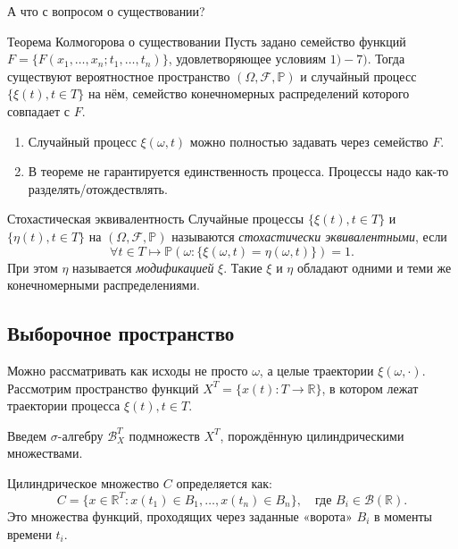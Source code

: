 А что с вопросом о существовании?

\begin{theorem}{Теорема Колмогорова о существовании}
    Пусть задано семейство функций $F = \{ F(x_1, \dots, x_n; t_1, \dots, t_n) \}$, удовлетворяющее условиям $1)-7)$.
    Тогда существуют вероятностное пространство $(\Omega, \mathcal{F}, \mathbb{P})$ и случайный процесс $\{\xi(t), t \in T\}$ на нём, семейство конечномерных распределений которого совпадает с $F$.
\end{theorem}

\begin{note}{}
    \begin{enumerate}
        \item Случайный процесс $\xi(\omega, t)$ можно полностью задавать через семейство $F$.
        \item В теореме не гарантируется единственность процесса. Процессы надо как-то разделять/отождествлять.
    \end{enumerate}
\end{note}

\begin{definition}{Стохастическая эквивалентность}
    Случайные процессы $\{\xi(t), t \in T\}$ и $\{\eta(t), t \in T\}$ на $(\Omega, \mathcal{F}, \mathbb{P})$ называются \textit{стохастически эквивалентными}, если
    \[
        \forall t \in T \longmapsto \mathbb{P}(\omega : \{ \xi(\omega, t) = \eta(\omega, t) \}) = 1.
    \]
    При этом $\eta$ называется \textit{модификацией} $\xi$. Такие $\xi$ и $\eta$ обладают одними и теми же конечномерными распределениями.
\end{definition}

\subsection*{Выборочное пространство}

Можно рассматривать как исходы не просто $\omega$, а целые траектории $\xi(\omega, \cdot)$. Рассмотрим пространство функций $X^T = \{x(t) : T \to \mathbb{R}\}$, в котором лежат траектории процесса $\xi(t), t \in T$.

Введем $\sigma$-алгебру $\mathcal{B}_{X}^T$ подмножеств $X^T$, порождённую цилиндрическими множествами.

Цилиндрическое множество $C$ определяется как:
\[
    C = \{ x \in \mathbb{R}^T : x(t_1) \in B_1, \dots, x(t_n) \in B_n \}, \quad \text{где } B_i \in \mathcal{B}(\mathbb{R}).
\]
Это множества функций, проходящих через заданные «ворота» $B_i$ в моменты времени $t_i$.

